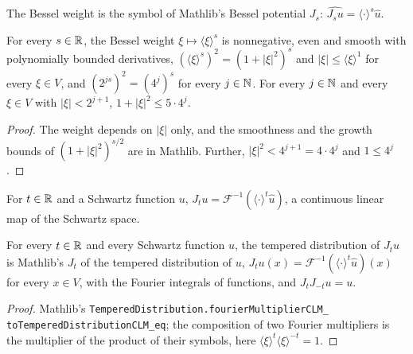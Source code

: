The Bessel weight is the symbol of Mathlib's Bessel potential $J_s$:
$\widehat{J_s u} = \langle \cdot \rangle^s \widehat u$.

\begin{lemma}
\label{lem:bessel-weight-basic}
\leanok
{}
For every $s \in \mathbb{R}$, the Bessel weight $\xi \mapsto \langle \xi \rangle^s$ is nonnegative, even
and smooth with polynomially bounded derivatives, $(\langle \xi \rangle^s)^2 = (1 + |\xi|^2)^s$ and
$|\xi| \leq \langle \xi \rangle^1$ for every $\xi \in V$, and $(2^{js})^2 = (4^j)^s$ for every
$j \in \mathbb{N}$. For every $j \in \mathbb{N}$ and every $\xi \in V$ with $|\xi| < 2^{j+1}$,
$1 + |\xi|^2 \leq 5 \cdot 4^j$.
\end{lemma}

\begin{proof}
\leanok
The weight depends on $|\xi|$ only, and the smoothness and the growth bounds of
$(1 + |\xi|^2)^{s/2}$ are in Mathlib. Further, $|\xi|^2 < 4^{j+1} = 4 \cdot 4^j$ and
$1 \leq 4^j$.
\end{proof}

\begin{definition}
\label{def:bessel-schwartz}
\leanok
{}
For $t \in \mathbb{R}$ and a Schwartz function $u$,
$J_t u = \mathcal F^{-1}(\langle \cdot \rangle^t \widehat u)$, a continuous linear map of the
Schwartz space.
\end{definition}

\begin{lemma}
\label{lem:bessel-schwartz-distribution}
\leanok
{}
For every $t \in \mathbb{R}$ and every Schwartz function $u$, the tempered distribution of $J_t u$ is
Mathlib's $J_t$ of the tempered distribution of $u$,
$J_t u(x) = \mathcal F^{-1}(\langle \cdot \rangle^t \widehat u)(x)$ for every $x \in V$, with the
Fourier integrals of functions, and $J_t J_{-t} u = u$.
\end{lemma}

\begin{proof}
\leanok
Mathlib's
\texttt{TemperedDistribution.\allowbreak fourierMultiplierCLM\_\allowbreak
toTemperedDistributionCLM\_\allowbreak eq}; the composition of two Fourier multipliers is the
multiplier of the product of their symbols, here
$\langle \xi \rangle^t \langle \xi \rangle^{-t} = 1$.
\end{proof}

